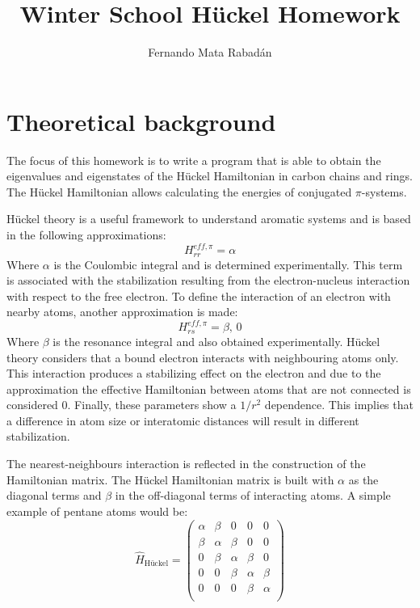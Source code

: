 \documentclass[twocolumn]{article}
\title{Winter School Hückel Homework}
\author{Fernando Mata Rabadán}
\date{}
\begin{document}
\maketitle


\section{Theoretical background}
The focus of this homework is to write a program that is able to obtain the eigenvalues and eigenstates of the Hückel Hamiltonian in carbon chains and rings. The Hückel Hamiltonian allows calculating the energies of conjugated $\pi$-systems. 

Hückel theory is a useful framework to understand aromatic systems and is based in the following approximations:
\begin{equation}
    H_{rr}^{eff, \pi} = \alpha
\end{equation}
Where $\alpha$ is the Coulombic integral and is determined experimentally.\cite{bishop1993group} This term is associated with the stabilization resulting from the electron-nucleus interaction with respect to the free electron. To define the interaction of an electron with nearby atoms, another approximation is made: 
\begin{equation}
    H_{rs}^{eff, \pi} = \beta,\,0
\end{equation}
Where $\beta$ is the resonance integral and also obtained experimentally.\cite{bishop1993group} Hückel theory considers that a bound electron interacts with neighbouring atoms only. This interaction produces a stabilizing effect on the electron and due to the approximation the effective Hamiltonian between atoms that are not connected is considered $0$. Finally, these parameters show a \(1/r^2\) dependence. This implies that a difference in atom size or interatomic distances will result in different stabilization. 

The nearest-neighbours interaction is reflected in the  construction of the Hamiltonian matrix. The Hückel Hamiltonian matrix is built with $\alpha$ as the diagonal terms and $\beta$ in the off-diagonal terms of interacting atoms. A simple example of pentane atoms would be: 
\begin{equation}
    \hat{H}_{\textrm{Hückel}}  =
    \begin{pmatrix}
        \alpha & \beta & 0 & 0 & 0 \\
        \beta & \alpha & \beta & 0 & 0 \\
        0 & \beta & \alpha & \beta & 0 \\
        0 & 0 & \beta & \alpha & \beta \\
        0 & 0 & 0 & \beta & \alpha \\
    \end{pmatrix}
\end{equation}
    
\end{document}
